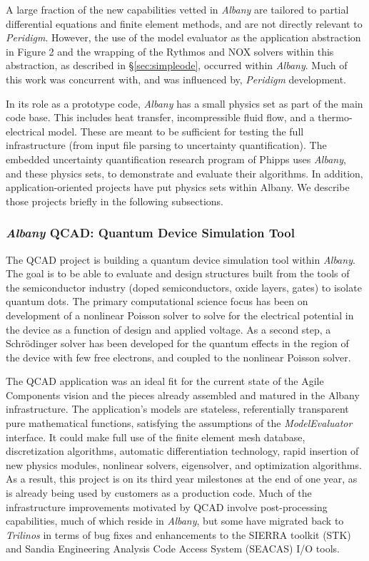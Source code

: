 \documentclass[10pt]{article}
\theoremstyle{plain}
\theoremstyle{definition}
\theoremstyle{remark}
\numberwithin{equation}{section}
\begin{document}
A large fraction of the new capabilities vetted in \emph{Albany} are tailored to partial differential equations and finite element methods, and are not directly relevant to \emph{Peridigm}. However, the use of the model evaluator as the application abstraction in Figure 2 and the wrapping of the Rythmos and NOX solvers within this abstraction, as described in \S\ref{sec:simpleode}, occurred within \emph{Albany}. Much of this work was concurrent with, and was influenced by, \emph{Peridigm} development.

In its role as a prototype code, \emph{Albany} has a small physics set as part of the main code base. This includes heat transfer, incompressible fluid flow, and a thermo-electrical model. These are meant to be sufficient for testing the full infrastructure (from input file parsing to uncertainty quantification). The embedded uncertainty quantification research program of Phipps uses \emph{Albany}, and these physics sets, to demonstrate and evaluate their algorithms. In addition, application-oriented projects have put physics sets within Albany. We describe those projects briefly in the following subsections.

\subsubsection{\emph{Albany} QCAD: Quantum Device Simulation Tool} \label{sec:albany:qcad}

The QCAD project \cite{QCADWebPage:2011} is building a quantum device simulation tool within \emph{Albany}. The goal is to be able to evaluate and design structures built from the tools of the semiconductor industry (doped semiconductors, oxide layers, gates) to isolate quantum dots. The primary computational science focus has been on development of a nonlinear Poisson solver to solve for the electrical potential in the device as a function of design and applied voltage. As a second step, a Schr\"{o}dinger solver has been developed for the quantum effects in the region of the device with few free electrons, and coupled to the nonlinear Poisson solver.

The QCAD application was an ideal fit for the current state of the Agile Components vision and the pieces already assembled and matured in the Albany infrastructure. The application's models are stateless, referentially transparent pure mathematical functions, satisfying the assumptions of the \emph{ModelEvaluator} interface. It could make full use of the finite element mesh database, discretization algorithms, automatic differentiation technology, rapid insertion of new physics modules, nonlinear solvers, eigensolver, and optimization algorithms. As a result, this project is on its third year milestones at the end of one year, as is already being used by customers as a production code. Much of the infrastructure improvements motivated by QCAD involve post-processing capabilities, much of which reside in \emph{Albany}, but some have migrated back to \emph{Trilinos} in terms of bug fixes and enhancements to the SIERRA toolkit (STK) and Sandia Engineering Analysis Code Access System (SEACAS) I/O tools.
\end{document}
